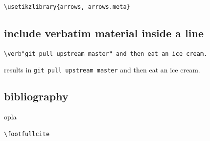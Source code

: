 \begin{verbatim}
\usetikzlibrary{arrows, arrows.meta}
\end{verbatim}


\subsection*{include verbatim material inside a line}

\begin{verbatim}
\verb"git pull upstream master" and then eat an ice cream.
\end{verbatim}
results in
\verb"git pull upstream master" and then eat an ice cream.

\subsection*{bibliography}

opla

\verb|\footfullcite|


